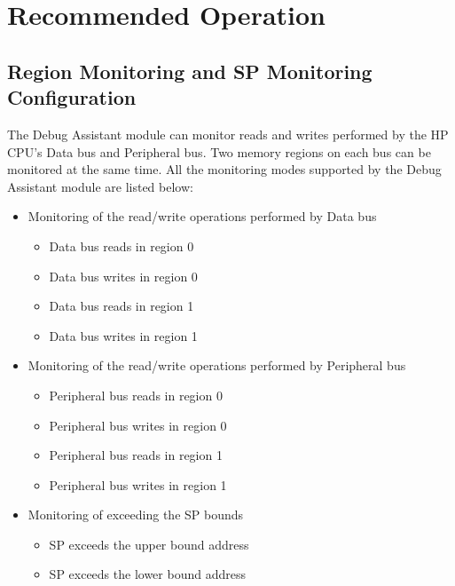 \documentclass[main\_\_EN.tex]{subfiles}
\begin{document}
\section{Recommended Operation}
\label{sec:dbgassist-recommended-operation}

\subsection{Region Monitoring and SP Monitoring Configuration}

The Debug Assistant module can monitor reads and writes performed by the HP CPU's Data bus and Peripheral bus. Two memory regions on each bus can be monitored at the same time. All the monitoring modes supported by the Debug Assistant module are listed below:

\begin{itemize}
    \item Monitoring of the read/write operations performed by Data bus
        \begin{itemize}
            \item Data bus reads in region 0
            \item Data bus writes in region 0
            \item Data bus reads in region 1
            \item Data bus writes in region 1
        \end{itemize}    
    \item Monitoring of the read/write operations performed by Peripheral bus
        \begin{itemize}
            \item Peripheral bus reads in region 0
            \item Peripheral bus writes in region 0
            \item Peripheral bus reads in region 1
            \item Peripheral bus writes in region 1
        \end{itemize}
    \item  Monitoring of exceeding the SP bounds
        \begin{itemize}
            \item SP exceeds the upper bound address
            \item SP exceeds the lower bound address
        \end{itemize}
\end{itemize}
\end{document}
